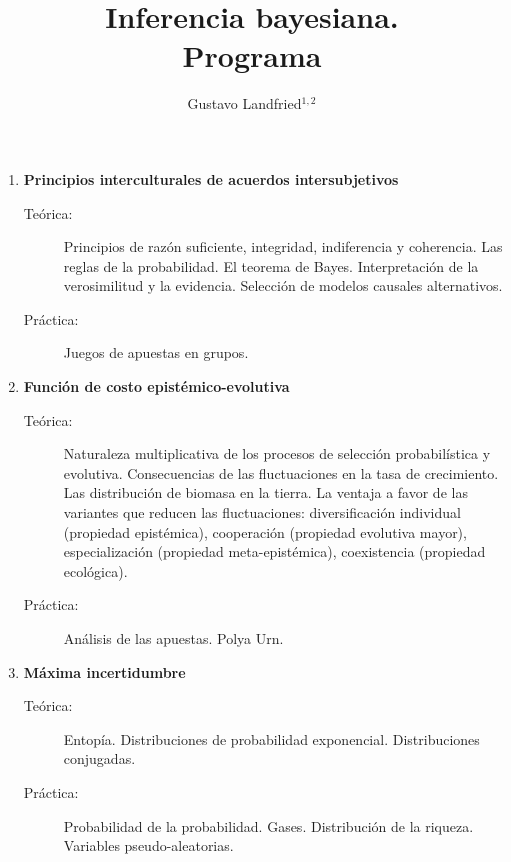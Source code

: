 \documentclass[10pt]{article}
\title{\huge Inferencia bayesiana.  \\  \LARGE Programa}
\author{Gustavo Landfried$^{1,2}$}
\affil{\small 1. Bayes de las Provincias Unidas del Sur }
\affil{\vspace{-0.2cm}\small 2. Laboratorio Pacha Pampas}
\affil[]{Correspondencia: \url{bayesdelsur@gmail.com}}
\begin{document}
\maketitle

\begin{enumerate}

\item \textbf{Principios interculturales de acuerdos intersubjetivos}
\vspace{-0.15cm}
\begin{description}
\item[Teórica:] Principios de razón suficiente, integridad, indiferencia y coherencia. Las reglas de la probabilidad. El teorema de Bayes. Interpretación de la verosimilitud y la evidencia. Selección de modelos causales alternativos. 
\item[Práctica:] Juegos de apuestas en grupos. 
\end{description}

\vspace{0.1cm}
\item \textbf{Función de costo epistémico-evolutiva}
\vspace{-0.15cm}
\begin{description}
\item[Teórica:] Naturaleza multiplicativa de los procesos de selección probabilística y evolutiva. Consecuencias de las fluctuaciones en la tasa de crecimiento. Las distribución de biomasa en la tierra. La ventaja a favor de las variantes que reducen las fluctuaciones: diversificación individual (propiedad epistémica), cooperación (propiedad evolutiva mayor), especialización (propiedad meta-epistémica), coexistencia (propiedad ecológica).
\item[Práctica:] Análisis de las apuestas. Polya Urn. 
\end{description}


\vspace{0.1cm}
\item \textbf{Máxima incertidumbre}
\vspace{-0.15cm}
\begin{description}
\item[Teórica:] Entopía. Distribuciones de probabilidad exponencial. Distribuciones conjugadas. 
\item[Práctica:] Probabilidad de la probabilidad. Gases. Distribución de la riqueza. Variables pseudo-aleatorias.
\end{description}


\end{enumerate}
\end{document}
